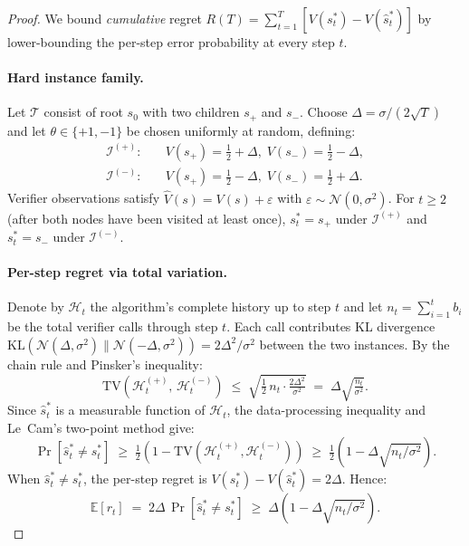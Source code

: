 \begin{proof}
We bound \emph{cumulative} regret $R(T) = \sum_{t=1}^T [V(s_t^*) - V(\hat{s}_t^*)]$
by lower-bounding the per-step error probability at every step $t$.

\paragraph{Hard instance family.}
Let $\mathcal{T}$ consist of root $s_0$ with two children $s_+$ and $s_-$.
Choose $\Delta = \sigma/(2\sqrt{T})$ and let $\theta \in \{+1,-1\}$ be chosen
uniformly at random, defining:
\begin{align*}
  \mathcal{I}^{(+)}: &\quad V(s_+) = \tfrac{1}{2}+\Delta,\; V(s_-) = \tfrac{1}{2}-\Delta,\\
  \mathcal{I}^{(-)}: &\quad V(s_+) = \tfrac{1}{2}-\Delta,\; V(s_-) = \tfrac{1}{2}+\Delta.
\end{align*}
Verifier observations satisfy $\hat{V}(s) = V(s)+\varepsilon$ with
$\varepsilon \sim \mathcal{N}(0,\sigma^2)$.
For $t \geq 2$ (after both nodes have been visited at least once),
$s_t^* = s_+$ under $\mathcal{I}^{(+)}$ and $s_t^* = s_-$ under $\mathcal{I}^{(-)}$.

\paragraph{Per-step regret via total variation.}
Denote by $\mathcal{H}_t$ the algorithm's complete history up to step $t$ and let
$n_t = \sum_{i=1}^t b_i$ be the total verifier calls through step $t$.
Each call contributes KL divergence $\mathrm{KL}(\mathcal{N}(\Delta,\sigma^2)\|\mathcal{N}(-\Delta,\sigma^2))
= 2\Delta^2/\sigma^2$ between the two instances.
By the chain rule and Pinsker's inequality:
\[
  \mathrm{TV}\!\left(\mathcal{H}_t^{(+)},\, \mathcal{H}_t^{(-)}\right)
  \;\leq\; \sqrt{\tfrac{1}{2}\,n_t \cdot \tfrac{2\Delta^2}{\sigma^2}}
  \;=\; \Delta\sqrt{\tfrac{n_t}{\sigma^2}}.
\]
Since $\hat{s}_t^*$ is a measurable function of $\mathcal{H}_t$, the
data-processing inequality and Le~Cam's two-point method give:
\[
  \Pr\!\left[\hat{s}_t^* \neq s_t^*\right]
  \;\geq\; \tfrac{1}{2}\!\left(1 - \mathrm{TV}\!\left(\mathcal{H}_t^{(+)},\mathcal{H}_t^{(-)}\right)\right)
  \;\geq\; \tfrac{1}{2}\!\left(1 - \Delta\sqrt{n_t/\sigma^2}\right).
\]
When $\hat{s}_t^* \neq s_t^*$, the per-step regret is $V(s_t^*) - V(\hat{s}_t^*) = 2\Delta$.
Hence:
\[
  \mathbb{E}[r_t] \;=\; 2\Delta\,\Pr\!\left[\hat{s}_t^* \neq s_t^*\right]
  \;\geq\; \Delta\!\left(1 - \Delta\sqrt{n_t/\sigma^2}\right).
\]


\end{proof}
